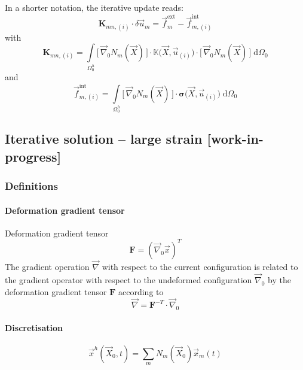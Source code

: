 \documentclass[times,namecite]{goose-article}
\begin{document}
In a shorter notation, the iterative update reads:
\begin{equation}
  \bm{K}_{mn,(i)} \cdot \delta \vec{u}_m
  =
  \vec{f}_m^\mathrm{ext}
  -
  \vec{f}_{m,(i)}^\mathrm{int}
\end{equation}
with
\begin{equation}
  \bm{K}_{mn,(i)}
  =
  \int\limits_{\Omega^h_0}
    \big[\, \vec{\nabla}_0 N_m(\vec{X}) \,\big]
    \cdot
    \mathbb{K}\big(\vec{X}, \vec{u}_{(i)}\big)
    \cdot
    \big[\, \vec{\nabla}_0 N_m(\vec{X}) \,\big] \;
  \mathrm{d}\Omega_0
\end{equation}
and
\begin{equation}
  \vec{f}_{m,(i)}^\mathrm{int}
  =
  \int\limits_{\Omega^h_0}
    \big[\, \vec{\nabla}_0 N_m(\vec{X}) \,\big]
    \cdot
    \bm{\sigma}\big(\vec{X}, \vec{u}_{(i)}\big) \;
  \mathrm{d}\Omega_0
\end{equation}

\subsection{Iterative solution -- large strain [work-in-progress]}

\subsubsection{Definitions}

\paragraph{Deformation gradient tensor}

Deformation gradient tensor
\begin{equation}
  \bm{F} = (\vec{\nabla}_0 \vec{x})^T
\end{equation}
The gradient operation $\vec{\nabla}$ with respect to the current configuration is related to the gradient operator with respect to the undeformed configuration $\vec{\nabla}_0$ by the deformation gradient tensor $\bm{F}$ according to
\begin{equation}
  \vec{\nabla} = \bm{F}^{-T} \cdot \vec{\nabla}_0
\end{equation}

\paragraph{Discretisation}

\begin{equation}
  \vec{x}^h (\vec{X}_0, t) = \sum\limits_{m} N_m (\vec{X}_0) \vec{x}_m (t)
\end{equation}
\end{document}
